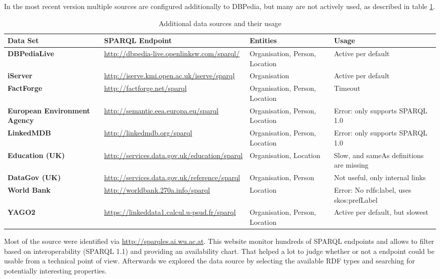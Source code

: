 \documentclass[11pt,titlepage,oneside,openany]{article}
\begin{document}
In the most recent version multiple sources are configured additionally to DBPedia, but many are not actively used, as described in table \ref{tab:sources}.
\begin{table}[ht]
	\begin{tabular*}{\textwidth}{p{}|p{}|p{} |p{3cm}}
		
		\textbf{Data Set} &\small \textbf{SPARQL Endpoint} & \textbf{Entities} & \textbf{Usage}  \\
		\hline 
		\textbf{DBPediaLive} &\small \url{http://dbpedia-live.openlinksw.com/sparql/} & Organisation, Person, Location  & Active per default\\
		\hline 
		\textbf{iServer} &\small \url{http://iserve.kmi.open.ac.uk/iserve/sparql} & Organisation & Active per default \\
		\hline 
		\textbf{FactForge} &\small \url{http://factforge.net/sparql} & Organisation, Person, Location & Timeout \\
		\hline 
		\textbf{European Environment Agency} &\small \url{http://semantic.eea.europa.eu/sparql} &  Organisation, Person, Location  & Error: only supports SPARQL 1.0  \\
		\hline   
		\textbf{LinkedMDB} &\small \url{http://linkedmdb.org/sparql} &  Organisation, Person, Location  & Error: only supports SPARQL 1.0 \\
		\hline 
		\textbf{Education (UK)} & \small \url{http://services.data.gov.uk/education/sparql} &  Organisation, Location  & Slow, and sameAs definitions are missing \\
		\hline 
		\textbf{DataGov (UK)} &\small \url{http://services.data.gov.uk/reference/sparql} &  Organisation, Person  & Not useful, only internal links\\
		\hline 
		\textbf{World Bank} &\small \url{http://worldbank.270a.info/sparql} &  Location & Error: No rdfs:label, uses skos:prefLabel \\
		\hline 
		\textbf{YAGO2} &\small \url{https://linkeddata1.calcul.u-psud.fr/sparql} &  Organisation, Person, Location & Active per default, but slowest \\
	\end{tabular*}
	\caption{Additional data sources and their usage}
	\label{tab:sources}
\end{table}

Most of the source were identified via \url{http://sparqles.ai.wu.ac.at}. This website monitor hundreds of SPARQL endpoints and allows to filter based on interoperability (SPARQL 1.1) and providing an availability chart. That helped a lot to judge whether or not a endpoint could be usable from a technical point of view. Afterwards we explored the data source by selecting the available RDF types and searching for potentially interesting properties. 
\end{document}
